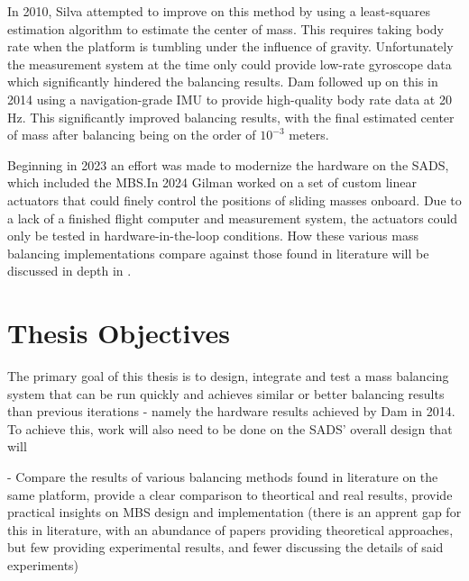 In 2010, Silva attempted to improve on this method by using a least-squares estimation algorithm to estimate the center of mass. This requires taking body rate when the platform is tumbling under the influence of gravity. Unfortunately the measurement system at the time only could provide low-rate gyroscope data which significantly hindered the balancing results. Dam followed up on this in 2014 using a navigation-grade IMU to provide high-quality body rate data at 20 Hz. This significantly improved balancing results, with the final estimated center of mass after balancing being on the order of $10^{-3}$ meters.

Beginning in 2023 an effort was made to modernize the hardware on the SADS, which included the MBS.\@ In 2024 Gilman worked on a set of custom linear actuators that could finely control the positions of sliding masses onboard. Due to a lack of a finished flight computer and measurement system, the actuators could only be tested in hardware-in-the-loop conditions. How these various mass balancing implementations compare against those found in literature will be discussed in depth in . 


\section{Thesis Objectives}

The primary goal of this thesis is to design, integrate and test a mass balancing system that can be run quickly and achieves similar or better balancing results than previous iterations - namely the hardware results achieved by Dam in 2014. To achieve this, work will also need to be done on the SADS' overall design that will 

- Compare the results of various balancing methods found in literature on the same platform, provide a clear comparison to theortical and real results, provide practical insights on MBS design and implementation (there is an apprent gap for this in literature, with an abundance of papers providing theoretical approaches, but few providing experimental results, and fewer discussing the details of said experiments)
